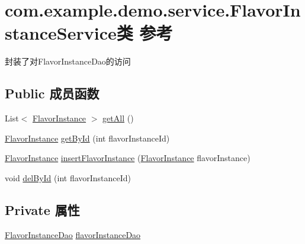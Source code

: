 \hypertarget{classcom_1_1example_1_1demo_1_1service_1_1_flavor_instance_service}{}\section{com.\+example.\+demo.\+service.\+Flavor\+Instance\+Service类 参考}
\label{classcom_1_1example_1_1demo_1_1service_1_1_flavor_instance_service}


封装了对\+Flavor\+Instance\+Dao的访问  


\subsection*{Public 成员函数}
\begin{DoxyCompactItemize}
\item 
List$<$ \mbox{\hyperlink{classcom_1_1example_1_1demo_1_1modular_1_1_flavor_instance}{Flavor\+Instance}} $>$ \mbox{\hyperlink{classcom_1_1example_1_1demo_1_1service_1_1_flavor_instance_service_aa3b1985225bec1f5a69ee14fa157af2a}{get\+All}} ()
\item 
\mbox{\hyperlink{classcom_1_1example_1_1demo_1_1modular_1_1_flavor_instance}{Flavor\+Instance}} \mbox{\hyperlink{classcom_1_1example_1_1demo_1_1service_1_1_flavor_instance_service_adf24a238609b9e216840c0b854cb15a9}{get\+By\+Id}} (int flavor\+Instance\+Id)
\item 
\mbox{\hyperlink{classcom_1_1example_1_1demo_1_1modular_1_1_flavor_instance}{Flavor\+Instance}} \mbox{\hyperlink{classcom_1_1example_1_1demo_1_1service_1_1_flavor_instance_service_aa3d45d39bf5d9c10a62720d831340c4a}{insert\+Flavor\+Instance}} (\mbox{\hyperlink{classcom_1_1example_1_1demo_1_1modular_1_1_flavor_instance}{Flavor\+Instance}} flavor\+Instance)
\item 
void \mbox{\hyperlink{classcom_1_1example_1_1demo_1_1service_1_1_flavor_instance_service_a3570866a038670c84ac6fbf62bce8c90}{del\+By\+Id}} (int flavor\+Instance\+Id)
\end{DoxyCompactItemize}
\subsection*{Private 属性}
\begin{DoxyCompactItemize}
\item 
\mbox{\hyperlink{interfacecom_1_1example_1_1demo_1_1dao_1_1_flavor_instance_dao}{Flavor\+Instance\+Dao}} \mbox{\hyperlink{classcom_1_1example_1_1demo_1_1service_1_1_flavor_instance_service_a70439a9226d7e127c86fd37ecff26b22}{flavor\+Instance\+Dao}}
\end{DoxyCompactItemize}


